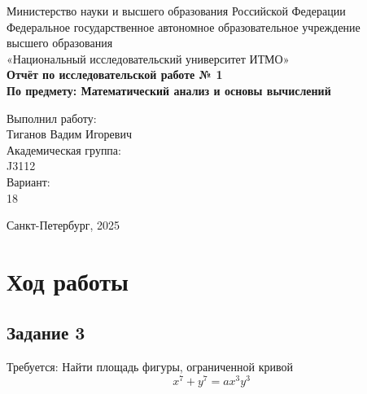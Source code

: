 \documentclass[a4paper,12pt]{article}
\begin{document}
\thispagestyle{empty}
\begin{center}
    \large
    Министерство науки и высшего образования Российской Федерации\\
    Федеральное государственное автономное образовательное учреждение\\
    высшего образования\\
    «Национальный исследовательский университет ИТМО»\\
    \vspace{5cm}
    \textbf{Отчёт по исследовательской работе № 1}\\
    \textbf{По предмету: Математический анализ и основы вычислений}\\
    \vspace{6cm}
    \begin{flushright}
        Выполнил работу:\\ Тиганов Вадим Игоревич\\
        \vspace{1cm}
        Академическая группа: \\ J3112\\
        \vspace{1cm}
        Вариант: \\18
    \end{flushright}
    \vspace{1cm}
    \vspace{3cm}
    \begin{center}
        Санкт-Петербург, 2025\\
    \end{center}
\end{center}

\newpage


\section{Ход работы}


\subsection{Задание 3}

Требуется:
Найти площадь фигуры, ограниченной кривой \[x^7 + y^7 = ax^3y^3\]
\end{document}
